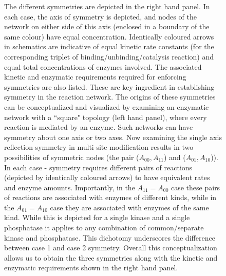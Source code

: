 \documentclass[9pt,lineno]{elife}
\begin{document}
\begin{figure}[H]
\begin{fullwidth}
{    The different symmetries are depicted in the right hand panel. In each case, the axis of symmetry is depicted, and nodes of the network on either side of this axis (enclosed in a boundary of the same colour) have equal concentration. Identically coloured arrows in schematics are indicative of equal kinetic rate constants (for the corresponding triplet of binding/unbinding/catalysis reaction) and equal total concentrations of enzymes involved. The associated kinetic and enzymatic requirements required for enforcing symmetries are also listed. These are key ingredient in establishing symmetry in the reaction network. The origins of these symmetries can be conceptualized and visualized by examining an enzymatic network with a ``square" topology (left hand panel), where every reaction is mediated by an enzyme. Such networks can have symmetry about one axis or two axes. Now examining the single axis reflection symmetry in multi-site modification results in two possibilities of symmetric nodes (the pair ($A_{00},A_{11}$) and ($A_{01},A_{10}$)). In each case - symmetry requires different pairs of reactions (depicted by identically coloured arrows) to have equivalent rates and enzyme amounts. Importantly, in the $A_{11} = A_{00}$ case these pairs of reactions are associated with enzymes of different kinds, while in the $A_{01}=A_{10}$ case they are associated with enzymes of the same kind. While this is depicted for a single kinase and a single phosphatase it applies to any combination of common/separate kinase and phosphatase. This dichotomy underscores the difference between case 1 and case 2 symmetry. Overall this conceptualization allows us to obtain the three symmetries along with the kinetic and enzymatic requirements shown in the right hand panel.
    }
    \label{Fig 1}
    \end{fullwidth}
\end{figure}
\end{document}

